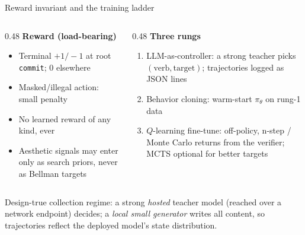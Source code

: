 \documentclass[aspectratio=169]{beamer}
\newcommand{\pitheta}{\pi_\theta}
\newcommand{\verbword}[1]{\texttt{#1}}
\begin{document}
\begin{frame}{Reward invariant and the training ladder}
  \begin{columns}[T]
    \begin{column}{0.48\textwidth}
      \textbf{Reward (load-bearing)}
      \begin{itemize}
        \item Terminal $+1/-1$ at root \verbword{commit}; $0$ elsewhere
        \item Masked/illegal action: small penalty
        \item No learned reward of any kind, ever
        \item Aesthetic signals may enter only as search priors, never as
              Bellman targets
      \end{itemize}
    \end{column}
    \begin{column}{0.48\textwidth}
      \textbf{Three rungs}
      \begin{enumerate}
        \item \alert{LLM-as-controller}: a strong teacher picks
              $(\text{verb},\text{target})$; trajectories logged as
              JSON lines
        \item Behavior cloning: warm-start $\pitheta$ on rung-1 data
        \item $Q$-learning fine-tune: off-policy, n-step / Monte Carlo
              returns from the verifier; MCTS optional for better targets
      \end{enumerate}
    \end{column}
  \end{columns}
  \medskip
  \footnotesize
  Design-true collection regime: a strong \emph{hosted} teacher model
  (reached over a network endpoint) decides; a \emph{local small generator}
  writes all content, so trajectories reflect the deployed model's state
  distribution.
\end{frame}
\end{document}

